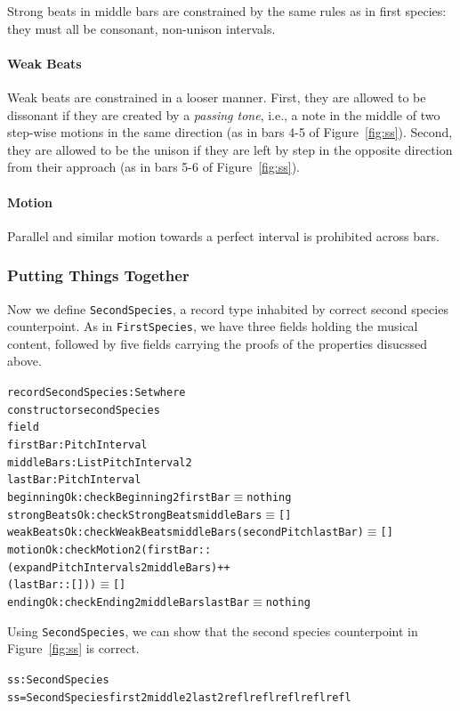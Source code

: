 Strong beats in middle bars are constrained by the same rules as in
first species: they must all be consonant, non-unison intervals.

\paragraph{Weak Beats}

Weak beats are constrained in a looser manner.
First, they are allowed to be dissonant if they are created by a
\emph{passing tone}, i.e., a note in the middle of two step-wise
motions in the same direction (as in bars 4-5 of Figure~\ref{fig:ss}).
Second, they are allowed to be the unison if they are left by step in
the opposite direction from their approach (as in bars 5-6 of
Figure~\ref{fig:ss}).

\paragraph{Motion}

Parallel and similar motion towards a perfect interval is prohibited
across bars.

\subsubsection{Putting Things Together}

Now we define \texttt{SecondSpecies}, a record type inhabited by
correct second species counterpoint.
As in \texttt{FirstSpecies}, we have three fields holding the musical
content, followed by five fields carrying the proofs of the properties
disucssed above.

\begin{alltt}
record SecondSpecies : Set where
  constructor secondSpecies
  field
    firstBar      : PitchInterval 
    middleBars    : List PitchInterval2
    lastBar       : PitchInterval 
    beginningOk   : checkBeginning2 firstBar \(\equiv\) nothing
    strongBeatsOk : checkStrongBeats middleBars \(\equiv\) []
    weakBeatsOk   : checkWeakBeats middleBars (secondPitch lastBar) \(\equiv\) []
    motionOk      : checkMotion2 (firstBar ::
                                  (expandPitchIntervals2 middleBars) ++
                                  (lastBar :: [])) \(\equiv\) []
    endingOk      : checkEnding2 middleBars lastBar \(\equiv\) nothing
\end{alltt}

Using \texttt{SecondSpecies}, we can show that the second species
counterpoint in Figure~\ref{fig:ss} is correct.

\begin{alltt}
ss : SecondSpecies
ss = SecondSpecies first2 middle2 last2 refl refl refl refl refl
\end{alltt}

